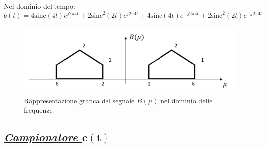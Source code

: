 \documentclass[a4paper]{article}
\begin{document}
	Nel dominio del tempo:
	\begin{equation*}
		b\left(t\right) = 4\mathrm{sinc}\left(4t\right)e^{j 2 \pi 4 t} + 2\mathrm{sinc}^{2}\left(2t\right)e^{j 2 \pi 4 t} + 4\mathrm{sinc}\left(4t\right)e^{-j 2 \pi 4 t} + 2\mathrm{sinc}^{2}\left(2t\right)e^{-j 2 \pi 4 t}
	\end{equation*}
	\begin{figure}[!htp]
		\centering
		\includegraphics[width=\textwidth]{img/fig_2.png}
		\caption*{Rappresentazione grafica del segnale $B\left(\mu\right)$ nel dominio delle frequenze.}
	\end{figure}\newpage
	
	\subsection*{\textcolor{Green4}{\textbf{\emph{\underline{Campionatore $\boldsymbol{c\left(t\right)}$}}}}}
	
\end{document}
